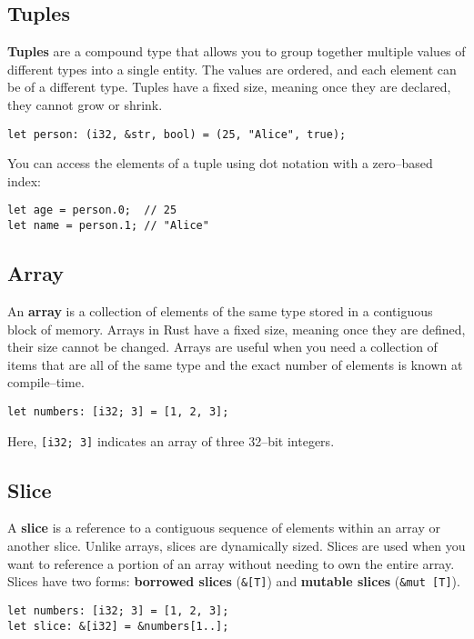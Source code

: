 \subsection{Tuples}
\textbf{Tuples} are a compound type that allows you to group together multiple values of different types into a single entity. 
The values are ordered, and each element can be of a different type. 
Tuples have a fixed size, meaning once they are declared, they cannot grow or shrink.

\begin{lstlisting}
let person: (i32, &str, bool) = (25, "Alice", true);
\end{lstlisting}

You can access the elements of a tuple using dot notation with a zero--based index:

\begin{lstlisting}
let age = person.0;  // 25
let name = person.1; // "Alice"
\end{lstlisting}

\subsection{Array}
An \textbf{array} is a collection of elements of the same type stored in a contiguous block of memory. Arrays in Rust have a fixed size, meaning once they are defined, their size cannot be changed.
Arrays are useful when you need a collection of items that are all of the same type and the exact number of elements is known at compile--time.

\begin{lstlisting}
let numbers: [i32; 3] = [1, 2, 3];
\end{lstlisting}

Here, \texttt{[i32; 3]} indicates an array of three 32--bit integers.

\subsection{Slice}
A \textbf{slice} is a reference to a contiguous sequence of elements within an array or another slice. Unlike arrays, slices are dynamically sized.
Slices are used when you want to reference a portion of an array without needing to own the entire array. Slices have two forms: \textbf{borrowed slices} (\texttt{\&[T]}) and \textbf{mutable slices} (\texttt{\&mut [T]}).

\begin{lstlisting}
let numbers: [i32; 3] = [1, 2, 3];
let slice: &[i32] = &numbers[1..];
\end{lstlisting}

